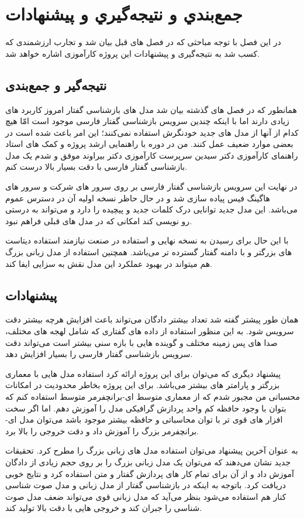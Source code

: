 \chapter{جمع‌بندي و نتيجه‌گيري و پیشنهادات}
در این فصل با توجه مباحثی که در فصل های قبل بیان شد و تجارب ارزشمندی که کسب شد به نتیجه‌گیری و پیشنهادات این پروژه کارآموزی اشاره خواهد شد.

\section{نتیجه‌گیر و جمع‌بندی}

همانطور که در فصل های گذشته بیان شد مدل های بازشناسی گفتار امروز کاربرد های زیادی دارند اما با اینکه چندین سرویس بازشناسی گفتار فارسی موجود است امّا هیچ کدام از آنها از مدل های جدید خودنگرش استفاده نمی‌کنند؛ این امر باعث شده است در بعضی موارد ضعیف عمل کنند. من در دوره با راهنمایی ارشد پروژه و کمک های استاد راهنمای کارآموزی دکتر سیدین سرپرست کارآموزی دکتر بیراوند موفق و شدم یک مدل بازشناسی گفتار فارسی با دقت بسیار بالا درست کنم.

در نهایت این سرویس بازشناسی گفتار فارسی بر روی سرور های شرکت و سرور های هاگینگ فیس پیاده سازی شد و در حال حاظر نسخه اولیه آن در دسترس عموم می‌باشد. این مدل جدید توانایی درک کلمات جدید و پیچیده را دارد و می‌تواند به درستی رو نویسی کند امکانی که در مدل های قبلی فراهم نبود.

با این حال برای رسیدن به نسخه نهایی و استفاده در صنعت نیازمند استفاده  دیتاست های بزرگتر و با دامنه گفتار گسترده تر می‌باشد. همچنین استفاده از مدل زبانی بزرگ هم میتواند در بهبود عملکرد این مدل نقش به سزایی ایفا کند.


\section{پیشنهادات}
همان طور پیشتر گفته شد تعداد بیشتر دادگان می‌تواند باعث افزایش هرچه بیشتر دقت سرویس شود. به این منظور استفاده از داده های گفتاری که شامل لهجه های مختلف، صدا های پس زمینه مختلف و گوینده هایی با بازه سنی بیشتر است می‌تواند دقت سرویس بازشناسی گفتار فارسی را بسیار افزایش دهد.

پیشنهاد دیگری که می‌توان برای این پروژه ارائه کرد استفاده مدل هایی با معماری بزرگتر و پارامتر های بیشتر می‌باشد. برای این پروژه بخاطر محدودیت در امکانات محسباتی من مجبور شدم که از معماری متوسط ای-برانچفرمر متوسط استفاده کنم که بتوان با وجود حافظه کم واحد پردازش گرافیکی مدل را آموزش دهم. اما اگر سخت افزار های قوی تر با توان محاسباتی و حافظه بیشتر موجود باشد می‌توان مدل ای-برانچفرمر بزرگ را آموزش داد و دقت خروجی را بالا برد.

به عنوان آخرین پیشنهاد می‌توان استفاده مدل های زبانی بزرگ را مطرح کرد.
تحقیقات جدید نشان می‌دهند که می‌توان یک مدل زبانی بزرگ را بر روی حجم زیادی از دادگان آموزش داد و از آن برای تمام کار های پردازش گفتار و متن استفاده کرد و نتایج خوبی دریافت کرد.\cite{huang2023language} باتوجه به اینکه در بازشناسی گفتار از مدل زبانی و مدل صوت شناسی کنار هم استفاده می‌شود بنظر می‌آید که مدل زبانی قوی می‌تواند ضعف مدل صوت شناسی را جبران کند و خروجی هایی با دقت بالا تولید کند.